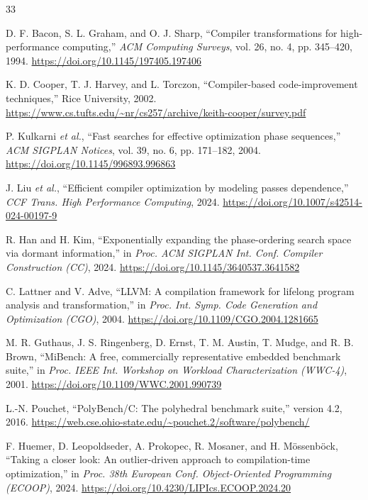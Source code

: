 \documentclass[conference,a4paper]{IEEEtran}
\begin{document}
\begin{thebibliography}{33}

D. F. Bacon, S. L. Graham, and O. J. Sharp,
``Compiler transformations for high-performance computing,''
\textit{ACM Computing Surveys}, vol. 26, no. 4, pp. 345--420, 1994.
\url{https://doi.org/10.1145/197405.197406}

K. D. Cooper, T. J. Harvey, and L. Torczon,
``Compiler-based code-improvement techniques,'' Rice University, 2002.
\url{https://www.cs.tufts.edu/~nr/cs257/archive/keith-cooper/survey.pdf}

P. Kulkarni \textit{et al.},
``Fast searches for effective optimization phase sequences,''
\textit{ACM SIGPLAN Notices}, vol. 39, no. 6, pp. 171--182, 2004.
\url{https://doi.org/10.1145/996893.996863}

J. Liu \textit{et al.},
``Efficient compiler optimization by modeling passes dependence,''
\textit{CCF Trans. High Performance Computing}, 2024.
\url{https://doi.org/10.1007/s42514-024-00197-9}

R. Han and H. Kim,
``Exponentially expanding the phase-ordering search space via dormant information,''
in \textit{Proc. ACM SIGPLAN Int. Conf. Compiler Construction (CC)}, 2024.
\url{https://doi.org/10.1145/3640537.3641582}

C. Lattner and V. Adve,
``LLVM: A compilation framework for lifelong program analysis and transformation,''
in \textit{Proc. Int. Symp. Code Generation and Optimization (CGO)}, 2004.
\url{https://doi.org/10.1109/CGO.2004.1281665}

M. R. Guthaus, J. S. Ringenberg, D. Ernst, T. M. Austin, T. Mudge, and R. B. Brown,
``MiBench: A free, commercially representative embedded benchmark suite,''
in \textit{Proc. IEEE Int. Workshop on Workload Characterization (WWC-4)}, 2001.
\url{https://doi.org/10.1109/WWC.2001.990739}

L.-N. Pouchet,
``PolyBench/C: The polyhedral benchmark suite,'' version 4.2, 2016.
\url{https://web.cse.ohio-state.edu/~pouchet.2/software/polybench/}

F. Huemer, D. Leopoldseder, A. Prokopec, R. Mosaner, and H. M\"ossenb\"ock,
``Taking a closer look: An outlier-driven approach to compilation-time optimization,''
in \textit{Proc. 38th European Conf. Object-Oriented Programming (ECOOP)}, 2024.
\url{https://doi.org/10.4230/LIPIcs.ECOOP.2024.20}


\end{thebibliography}
\end{document}
